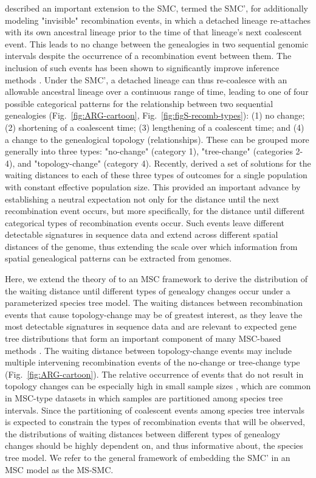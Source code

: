 \documentclass[11pt]{article}
\begin{document}
\cite{marjoram2006fast}
described an important extension to the SMC, termed the SMC', for additionally
modeling "invisible" recombination events, in which a detached lineage re-attaches
with its own ancestral lineage prior to the time of that lineage's next coalescent event. 
This leads to no change between the genealogies in two sequential genomic intervals
despite the occurrence of a recombination event between them. The inclusion of
such events has been shown to 
significantly improve inference methods \citep{wilton2015smc}. 
Under the SMC', a detached lineage can thus re-coalesce with an allowable 
ancestral lineage over a continuous range of time, leading to one of 
four possible categorical patterns for the relationship between two
sequential genealogies
(Fig.~\ref{fig:ARG-cartoon}, Fig.~\ref{fig:figS-recomb-types}):
(1) no change;
(2) shortening of a coalescent time; (3) lengthening of a coalescent time; 
and (4) a change to the genealogical topology (relationships).
These can be grouped more generally into three types: 
"no-change" (category 1), "tree-change" (categories 2-4), and "topology-change"
(category 4). Recently, \citet{deng_distribution_2021} derived a set of 
solutions for the waiting distances to each of these three types of 
outcomes for a single population with constant effective population size.
This provided an important advance by establishing a neutral expectation 
not only for the distance until the next recombination event occurs, 
but more specifically, for the distance until different categorical types
of recombination events occur. Such events leave different detectable 
signatures in sequence data and extend across different spatial distances 
of the genome, thus extending the scale over which information from 
spatial genealogical patterns can be extracted from genomes.


Here, we extend the theory of \citet{deng_distribution_2021} to an MSC framework
to derive the distribution of the waiting distance until different types of
genealogy changes occur under a parameterized species tree model.
The waiting distances between recombination events that cause topology-change 
may be of greatest interest, as they leave the most detectable signatures 
in sequence data and are relevant to expected gene tree distributions that form
an important component of many MSC-based methods \citep{
degnan2009gene, baum_concordance_2007, knowles_estimating_2011}.
The waiting distance between topology-change events may include multiple
intervening recombination events of the no-change or tree-change type
(Fig.~\ref{fig:ARG-cartoon}).
The relative occurrence of events that do not result in topology 
changes can be especially high in small sample sizes \citep{wilton2015smc}, 
which are common in MSC-type datasets in which samples are partitioned 
among species tree intervals. 
Since the partitioning of 
coalescent events among species tree intervals is expected to constrain 
the types of recombination events that will be observed, the
distributions of waiting distances between different types of 
genealogy changes should be highly dependent on, and thus informative about, 
the species tree model. We refer to the general framework of embedding the 
SMC' in an MSC model as the MS-SMC.
\end{document}
